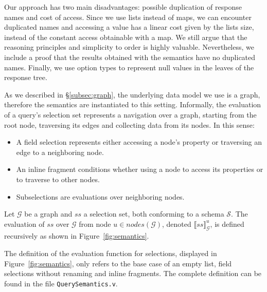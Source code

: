  Our approach has two main disadvantages: possible duplication of response names and cost of access. Since we use lists instead of maps, we can encounter duplicated names and accessing a value has a linear cost given by the lists size, instead of the constant access obtainable with a map. We still argue that the reasoning principles and simplicity to order is highly valuable. Nevertheless, we include a proof that the results obtained with the semantics have no duplicated names. Finally, we use option types to represent null values in the leaves of the response tree.



As we described in \S\ref{subsec:graph}, the underlying data model we use is a graph, therefore the semantics are instantiated to this setting. %
Informally, the evaluation of a query's selection set represents a navigation over a graph, starting from the root node, traversing its edges and collecting data from its nodes. In this sense:
\begin{itemize}
    \item A field selection represents either accessing a node's property or traversing an edge to a neighboring node.
    \item An inline fragment conditions whether using a node to access its properties or to traverse to other nodes.
    \item Subselections are evaluations over neighboring nodes.
\end{itemize}

\begin{definition}
Let $\mathcal{G}$ be a graph and $ss$ a selection set, both conforming to a schema $\mathcal{S}$. The evaluation of $ss$ over $\mathcal{G}$ from node $u \in \mathit{nodes}(\mathcal{G})$, denoted $\llbracket ss \rrbracket^{u}_{\mathcal{G}}$, is defined recursively as shown in Figure~\ref{fig:semantics}. 
\end{definition}

The definition of the evaluation function for selections, displayed in Figure~\ref{fig:semantics}, only refers to the base case of an empty list, field selections without renaming and inline fragments. The complete definition can be found in the file \texttt{QuerySemantics.v}.

